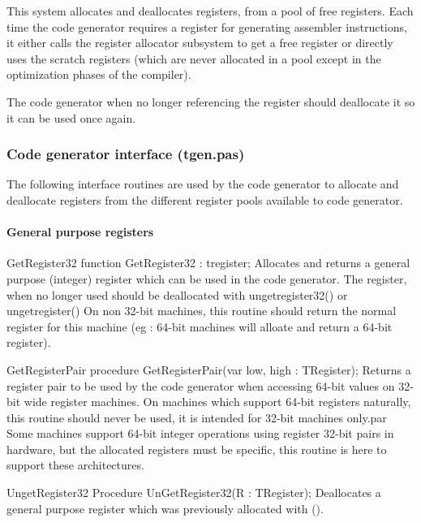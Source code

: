 \documentclass [a4paper,12pt]{article}
\begin{document}
This system allocates and deallocates registers, from a pool of free
registers. Each time the code generator requires a register for generating
assembler instructions, it either calls the register allocator subsystem to
get a free register or directly uses the scratch registers (which are never
allocated in a pool except in the optimization phases of the compiler).

The code generator when no longer referencing the register should deallocate
it so it can be used once again.

\subsubsection{Code generator interface (tgen.pas)}
\label{subsubsec:mylabel29}

The following interface routines are used by the code generator to allocate
and deallocate registers from the different register pools available to code
generator.

\paragraph{General purpose registers}

\begin{function}{GetRegister32}
\Declaration
function GetRegister32 : tregister;
\Description
Allocates and returns a general purpose (integer) register which can be used
in the code generator. The register, when no longer used should be
deallocated with ungetregister32() or ungetregister()
\Notes
On non 32-bit machines, this routine should return the normal register for
this machine (eg : 64-bit machines will alloate and return a 64-bit
register).
\end{function}

\begin{procedure}{GetRegisterPair}
\Declaration
procedure GetRegisterPair(var low, high : TRegister);
\Description
Returns a register pair to be used by the code generator when accessing
64-bit values on 32-bit wide register machines.
\Notes
On machines which support 64-bit registers naturally, this routine should
never be used, it is intended for 32-bit machines only.par Some machines
support 64-bit integer operations using register 32-bit pairs in hardware,
but the allocated registers must be specific, this routine is here to
support these architectures.
\end{procedure}

\begin{procedure}{UngetRegister32}
\Declaration
Procedure UnGetRegister32(R : TRegister);
\Description
Deallocates a general purpose register which was previously allocated with
().
\end{procedure}
\end{document}
